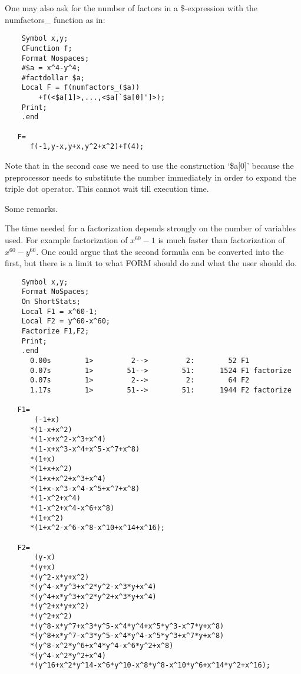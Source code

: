 \noindent One may also ask for the number of factors in a \$-expression 
with the numfactors\_ function as in:
\begin{verbatim}
    Symbol x,y;
    CFunction f;
    Format Nospaces;
    #$a = x^4-y^4;
    #factdollar $a;
    Local F = f(numfactors_($a))
        +f(<$a[1]>,...,<$a[`$a[0]']>);
    Print;
    .end

   F=
      f(-1,y-x,y+x,y^2+x^2)+f(4);
\end{verbatim}
\noindent Note that in the second case we need to use the construction 
`\$a[0]' because the preprocessor needs to substitute the number 
immediately in order to expand the triple dot operator. This cannot wait 
till execution time.

\noindent Some remarks.

\noindent The time needed for a factorization depends strongly on the 
number of variables used. For example factorization of $x^{60}-1$ is much 
faster than factorization of $x^{60}-y^{60}$. One could argue that the 
second formula can be converted into the first, but there is a limit to 
what FORM should do and what the user should do.
\begin{verbatim}
    Symbol x,y;
    Format NoSpaces;
    On ShortStats;
    Local F1 = x^60-1;
    Local F2 = y^60-x^60;
    Factorize F1,F2;
    Print;
    .end
      0.00s        1>         2-->         2:        52 F1 
      0.07s        1>        51-->        51:      1524 F1 factorize
      0.07s        1>         2-->         2:        64 F2 
      1.17s        1>        51-->        51:      1944 F2 factorize

   F1=
       (-1+x)
      *(1-x+x^2)
      *(1-x+x^2-x^3+x^4)
      *(1-x+x^3-x^4+x^5-x^7+x^8)
      *(1+x)
      *(1+x+x^2)
      *(1+x+x^2+x^3+x^4)
      *(1+x-x^3-x^4-x^5+x^7+x^8)
      *(1-x^2+x^4)
      *(1-x^2+x^4-x^6+x^8)
      *(1+x^2)
      *(1+x^2-x^6-x^8-x^10+x^14+x^16);

   F2=
       (y-x)
      *(y+x)
      *(y^2-x*y+x^2)
      *(y^4-x*y^3+x^2*y^2-x^3*y+x^4)
      *(y^4+x*y^3+x^2*y^2+x^3*y+x^4)
      *(y^2+x*y+x^2)
      *(y^2+x^2)
      *(y^8-x*y^7+x^3*y^5-x^4*y^4+x^5*y^3-x^7*y+x^8)
      *(y^8+x*y^7-x^3*y^5-x^4*y^4-x^5*y^3+x^7*y+x^8)
      *(y^8-x^2*y^6+x^4*y^4-x^6*y^2+x^8)
      *(y^4-x^2*y^2+x^4)
      *(y^16+x^2*y^14-x^6*y^10-x^8*y^8-x^10*y^6+x^14*y^2+x^16);
\end{verbatim}

